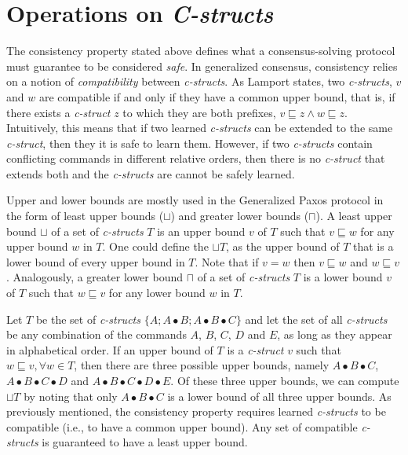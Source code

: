 \section{Operations on \textit{C-structs}} \label{Operations}
The consistency property stated above defines what a consensus-solving protocol must guarantee to be considered \textit{safe}. In generalized consensus, consistency relies on a notion of \textit{compatibility} between \textit{c-structs}. As Lamport states, two \textit{c-structs}, $v$ and $w$ are compatible if and only if they have a common upper bound, that is, if there exists a \textit{c-struct} $z$ to which they are both prefixes, $v \sqsubseteq z \land w \sqsubseteq z$. Intuitively, this means that if two learned \textit{c-structs} can be extended to the same \textit{c-struct}, then they it is safe to learn them. However, if two \textit{c-structs} contain conflicting commands in different relative orders, then there is no \textit{c-struct} that extends both and the \textit{c-structs} are cannot be safely learned.\par
Upper and lower bounds are mostly used in the Generalized Paxos protocol in the form of least upper bounds ($\sqcup$) and greater lower bounds ($\sqcap$). A least upper bound $\sqcup$ of a set of \textit{c-structs} $T$  is an upper bound $v$ of $T$ such that $v \sqsubseteq w$ for any upper bound $w$ in $T$. One could define the $\sqcup T$, as the upper bound of $T$ that is a lower bound of every upper bound in $T$. Note that if $v = w$ then $v\sqsubseteq w$ and $w\sqsubseteq v$. Analogously, a greater lower bound $\sqcap$ of a set of \textit{c-structs} $T$ is a lower bound $v$ of $T$ such that $w \sqsubseteq v$ for any lower bound $w$ in $T$. \par
Let $T$ be the set of \textit{c-structs} $\{A ; A \bullet B ; A \bullet B \bullet C\}$ and let the set of all \textit{c-structs} be any combination of the commands $A$, $B$, $C$, $D$ and $E$, as long as they appear in alphabetical order. If an upper bound of $T$ is a \textit{c-struct} $v$ such that $w \sqsubseteq v, \forall w \in T$, then there are three possible upper bounds, namely $A \bullet B \bullet C$, $A \bullet B \bullet C \bullet D$ and $A \bullet B \bullet C \bullet D \bullet E$. Of these three upper bounds, we can compute $\sqcup T$ by noting that only $A \bullet B \bullet C$ is a lower bound of all three upper bounds. As previously mentioned, the consistency property requires learned \textit{c-structs} to be compatible (i.e., to have a common upper bound). Any set of compatible \textit{c-structs} is guaranteed to have a least upper bound. \par 
